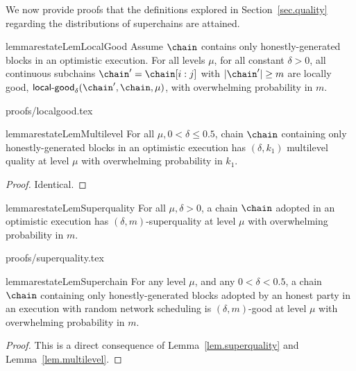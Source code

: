 \label{sec.app-quality}

We now provide proofs that the definitions explored in Section~\ref{sec.quality}
regarding the distributions of superchains are attained.

\begin{restatable}{lemma}{restateLemLocalGood}
\label{lem.localgood}
Assume $\chain$ contains only honestly-generated blocks in an optimistic
execution. For all levels $\mu$, for all constant $\delta > 0$, all continuous
subchains $\chain' = \chain[i:j]$ with $|\chain'| \geq m$ are locally good,
$\textsf{local-good}_{\delta}(\chain', \chain, \mu)$, with overwhelming
probability in $m$.
\end{restatable}
{proofs/localgood.tex}

\begin{restatable}{lemma}{restateLemMultilevel}
\label{lem.multilevel}
For all $\mu, 0 < \delta \leq 0.5$, chain $\chain$ containing only
honestly-generated blocks in an optimistic execution has $(\delta, k_1)$
multilevel quality at level $\mu$ with overwhelming probability in $k_1$.
\end{restatable}
\begin{proof}
Identical.
\Qed
\end{proof}

\begin{restatable}[Superquality]{lemma}{restateLemSuperquality}
\label{lem.superquality}
For all $\mu, \delta > 0$, a chain $\chain$ adopted in an optimistic execution
has $(\delta, m)$-superquality at level $\mu$ with overwhelming probability in
$m$.
\end{restatable}
{proofs/superquality.tex}

\begin{restatable}{lemma}{restateLemSuperchain}
\label{lem.superchain-distribution}
For any level $\mu$, and any $0 < \delta < 0.5$, a chain
$\chain$ containing only honestly-generated blocks adopted by an honest party in
an execution with random network scheduling is $(\delta, m)$-good at level
$\mu$ with overwhelming probability in $m$.
\end{restatable}
\begin{proof}
This is a direct consequence of Lemma~\ref{lem.superquality} and
Lemma~\ref{lem.multilevel}. \Qed
\end{proof}
